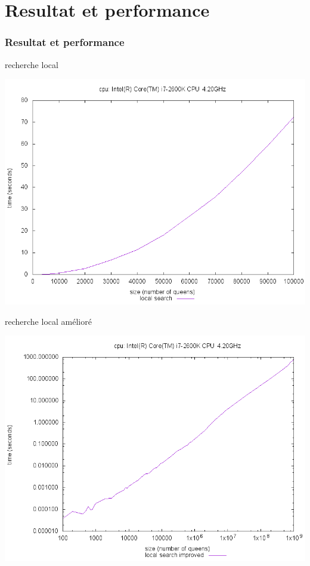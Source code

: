 \documentclass[10pt,a4paper]{beamer}
\begin{document}
\section{Resultat et performance}
\begin{frame}
	\frametitle{Resultat et performance}

	\begin{block}{recherche local}
	
	\includegraphics[width=1\textwidth]{images/plot_ls_i7.png}
	
	\end{block}
	
	\begin{block}{recherche local amélioré}
	
	\includegraphics[width=1\textwidth]{images/plot_lst_i7.png}
	

\end{block}
\end{frame}
\end{document}
